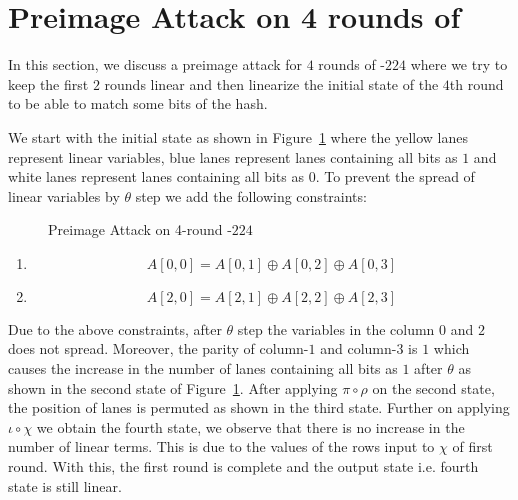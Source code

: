 \section{Preimage Attack on 4 rounds of }
    
In this section, we discuss a preimage attack for $4$ rounds of \KECCAK{}-$224$ where we try to keep the first $2$ rounds linear and then linearize the initial state of the $4$th round to be able to match some bits of the hash.

We start with the initial state as shown in Figure~\ref{fig:keccak224} where the yellow lanes represent linear variables, blue lanes represent lanes containing all bits as $1$ and white lanes represent lanes containing all bits as $0$. To prevent the spread of linear variables by $\theta$ step we add the following constraints:

\begin{figure}[H]
    \caption{Preimage Attack on 4-round \KECCAK-$224$}
    \label{fig:keccak224}
\end{figure}



\begin{enumerate}
    \item \[
        A[0,0] = A[0,1] \oplus A[0,2] \oplus A[0, 3]
    \]
\item \[
        A[2,0] = A[2,1] \oplus A[2,2] \oplus A[2,3]
    \]
\end{enumerate}

Due to the above constraints, after $\theta$ step the variables in the column $0$ and $2$ does not spread. Moreover, the parity of column-$1$ and column-$3$ is $1$ which causes the increase in the number of lanes containing all bits as $1$ after $\theta$ as shown in the second state of Figure~\ref{fig:keccak224}. After applying $\pi \circ \rho$ on the second state, the position of lanes is permuted as shown in the third state. Further on applying $\iota \circ \chi$ we obtain the fourth state, we observe that there is no increase in the number of linear terms. This is due to the values of the rows input to $\chi$ of first round. With this, the first round is complete and the output state i.e. fourth state is still linear.

